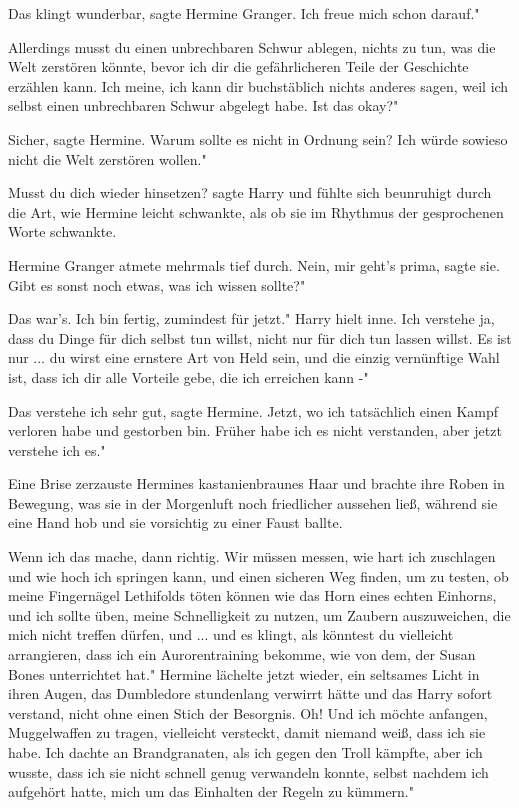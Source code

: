 \glqq{}Das klingt wunderbar\grqq{}, sagte Hermine Granger. \glqq{}Ich freue mich
schon darauf."

\glqq{}Allerdings musst du einen unbrechbaren Schwur ablegen, nichts zu tun, was
die Welt zerstören könnte, bevor ich dir die gefährlicheren Teile der Geschichte
erzählen kann. Ich meine, ich kann dir buchstäblich nichts anderes sagen, weil
ich selbst einen unbrechbaren Schwur abgelegt habe. Ist das okay?"

\glqq{}Sicher\grqq{}, sagte Hermine. \glqq{}Warum sollte es nicht in Ordnung sein?
Ich würde sowieso nicht die Welt zerstören wollen."

\glqq{}Musst du dich wieder hinsetzen?\grqq{} sagte Harry und fühlte sich
beunruhigt durch die Art, wie Hermine leicht schwankte, als ob sie im Rhythmus
der gesprochenen Worte schwankte.

Hermine Granger atmete mehrmals tief durch. \glqq{}Nein, mir geht's prima\grqq{},
sagte sie. \glqq{}Gibt es sonst noch etwas, was ich wissen sollte?"

\glqq{}Das war's. Ich bin fertig, zumindest für jetzt." Harry hielt inne. \glqq
Ich verstehe ja, dass du Dinge für dich selbst tun willst, nicht nur für dich
tun lassen willst. Es ist nur ... du wirst eine ernstere Art von Held sein, und
die einzig vernünftige Wahl ist, dass ich dir alle Vorteile gebe, die ich
erreichen kann -"

\glqq{}Das verstehe ich sehr gut\grqq{}, sagte Hermine. \glqq{}Jetzt, wo ich
tatsächlich einen Kampf verloren habe und gestorben bin. Früher habe ich es
nicht verstanden, aber jetzt verstehe ich es."

Eine Brise zerzauste Hermines kastanienbraunes Haar und brachte ihre Roben in
Bewegung, was sie in der Morgenluft noch friedlicher aussehen ließ, während sie
eine Hand hob und sie vorsichtig zu einer Faust ballte.

\glqq{}Wenn ich das mache, dann richtig. Wir müssen messen, wie hart ich
zuschlagen und wie hoch ich springen kann, und einen sicheren Weg finden, um zu
testen, ob meine Fingernägel Lethifolds töten können wie das Horn eines echten
Einhorns, und ich sollte üben, meine Schnelligkeit zu nutzen, um Zaubern
auszuweichen, die mich nicht treffen dürfen, und ... und es klingt, als könntest
du vielleicht arrangieren, dass ich ein Aurorentraining bekomme, wie von dem,
der Susan Bones unterrichtet hat." Hermine lächelte jetzt wieder, ein seltsames
Licht in ihren Augen, das Dumbledore stundenlang verwirrt hätte und das Harry
sofort verstand, nicht ohne einen Stich der Besorgnis. \glqq{}Oh! Und ich möchte
anfangen, Muggelwaffen zu tragen, vielleicht versteckt, damit niemand weiß, dass
ich sie habe. Ich dachte an Brandgranaten, als ich gegen den Troll kämpfte, aber
ich wusste, dass ich sie nicht schnell genug verwandeln konnte, selbst nachdem
ich aufgehört hatte, mich um das Einhalten der Regeln zu kümmern."

